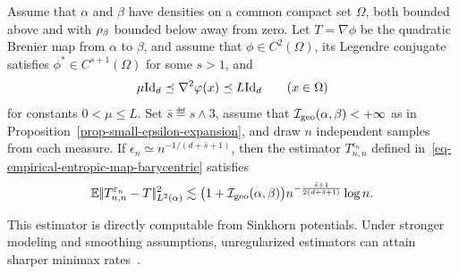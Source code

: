 \begin{prop}\label{prop-entropic-map-rate}
	Assume that \(\alpha\) and \(\beta\) have densities on a common compact set \(\Omega\), both bounded above and with \(\rho_{\beta}\) bounded below away from zero. Let \(T=\nabla\phi\) be the quadratic Brenier map from \(\alpha\) to \(\beta\), and assume that \(\phi\in C^2(\Omega)\), its Legendre conjugate satisfies \(\phi^*\in C^{s+1}(\Omega)\) for some \(s>1\), and
	\[
		\mu\mathrm{Id}_d\preceq\nabla^2\varphi(x)\preceq L\mathrm{Id}_d
		\qquad (x\in\Omega)
	\]
	for constants \(0<\mu\leq L\). Set \(\bar s\eqdef s\wedge3\), assume that \(\mathcal I_{\rm geo}(\alpha,\beta)<+\infty\) as in Proposition~\ref{prop-small-epsilon-expansion}, and draw \(n\) independent samples from each measure. If \(\epsilon_n\simeq n^{-1/(d+\bar s+1)}\), then the estimator \(T_{n,n}^{\epsilon_n}\) defined in~\eqref{eq-empirical-entropic-map-barycentric} satisfies
	\[
		\mathbb{E}|\!| T_{n,n}^{\varepsilon_n}-T |\!|_{L^2(\alpha)}^2
		\lesssim
		\bigl(1+\mathcal I_{\rm geo}(\alpha,\beta)\bigr)
		n^{-\frac{\bar s+1}{2(d+\bar s+1)}}\log n.
	\]
\end{prop}

This estimator is directly computable from Sinkhorn potentials. Under stronger modeling and smoothing assumptions, unregularized estimators can attain sharper minimax rates~\cite{hutter2021minimaxOTMaps,deb2021ratesBarycentricMaps,manole2021pluginOTMaps}.

